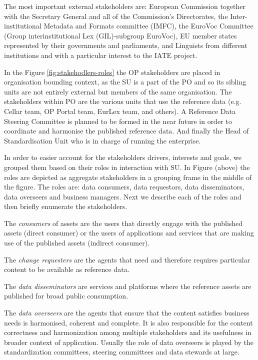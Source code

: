 	The most important external stakeholders are: European Commission together with the Secretary General and all of the Commission’s Directorates, the Inter-institutional Metadata and Formats committee (IMFC), the EuroVoc Committee (Group interinstitutional Lex (GIL)-subgroup EuroVoc), EU member states represented by their governments and parliaments, and Linguists from different institutions and with a particular interest to the IATE project.
	 
	In the Figure \ref{fig:stakehodlers-roles} the OP stakeholders are placed in organisation bounding context, as the SU is a part of the PO and so its sibling units are not entirely external but members of the same organisation. The stakeholders within PO are the various units that use the reference data (e.g. Cellar team, OP Portal team, EurLex team, and others). A Reference Data Steering Committee is planned to be formed in the near future in order to coordinate and harmonise the published reference data. And finally the Head of Standardisation Unit who is in charge of running the enterprise.
	 
	In order to easier account for the stakeholders drivers, interests and goals, we grouped them based on their roles in interaction with SU. In Figure (above) the roles are depicted as aggregate stakeholders in a grouping frame in the middle of the figure. The roles are: data consumers, data requestors, data disseminators, data overseers and business managers. Next we describe each of the roles and then briefly enumerate the stakeholders.
	 
	The \textit{consumers} of assets are the users that directly engage with the published assets (direct consumer) or the users of applications and services that are making use of the published assets (indirect consumer).
	
	The \textit{change requesters} are the agents that need and therefore requires particular content to be available as reference data. 
	
	The \textit{data disseminators} are services and platforms where the reference assets are published for broad public consumption.
	
	The \textit{data overseers} are the agents that ensure that the content satisfies business needs is harmonised, coherent and complete. It is also responsible for the content correctness and harmonization among multiple stakeholders and its usefulness in broader context of application. Usually the role of data overseers is played by the standardization committees, steering committees and data stewards at large.
	
